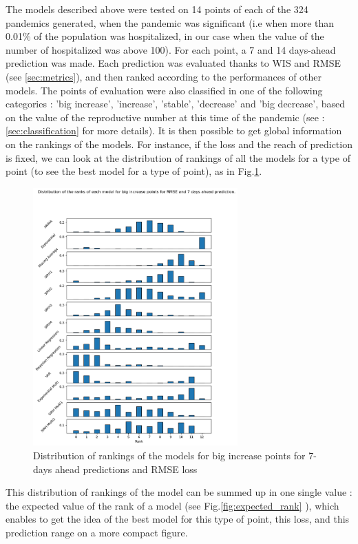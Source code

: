 The models described above were tested on 14 points of each of the 324 pandemics generated, when the pandemic was significant (i.e when more than 0.01\% of the population was hospitalized, in our case when the value of the number of hospitalized was above 100). 
For each point, a 7 and 14 days-ahead prediction was made. 
Each prediction was evaluated thanks to WIS and RMSE (see \ref{sec:metrics}), and then ranked according to the performances of other models.
The points of evaluation were also classified in one of the following categories : 'big increase', 'increase', 'stable', 'decrease' and 'big decrease', based on the value of the reproductive number at this time of the pandemic (see :\ref{sec:classification} for more details). 
It is then possible to get global information on the rankings of the models. 
For instance, if the loss and the reach of prediction is fixed, we can look at the distribution of rankings of all the models for a type of point (to see the best model for a type of point), as in Fig.\ref{fig:rankings}.
\begin{figure}[h]
    \centering
    \includegraphics[width=0.7\textwidth]{figures/ranks_big_increase_RMSE_7.png}
    \caption{Distribution of rankings of the models for big increase points for 7-days ahead predictions and RMSE loss}
    \label{fig:rankings}
\end{figure}
This distribution of rankings of the model can be summed up in one single value : the expected value of the rank of a model (see Fig.\ref{fig:expected_rank} ), which enables to get the idea of the best model for this type of point, this loss, and this prediction range on a more compact figure. 


